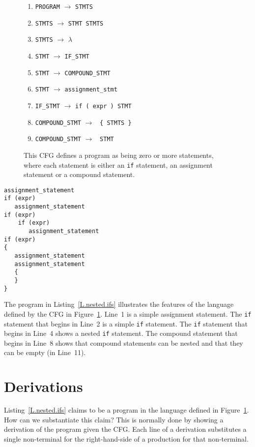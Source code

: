 \documentclass[letterpaper,12pt,openany,reqno]{book}%
\newcommand{\code}[1] {\lstinline[breaklines=yes,breakatwhitespace=yes]{#1}}
\newcommand{\cfgprod}[2] {\texttt{#1} $\rightarrow$ \texttt{#2}}
\begin{document}
\begin{figure}[hbt]
\centering
\begin{enumerate}
\item \cfgprod{PROGRAM}{STMTS}
\item \cfgprod{STMTS}{STMT STMTS}
\item \cfgprod{STMTS}{$\lambda$}
\item \cfgprod{STMT}{IF\_STMT}
\item \cfgprod{STMT}{COMPOUND\_STMT}
\item \cfgprod{STMT}{assignment\_stmt}
\item \cfgprod{IF\_STMT} {if ( expr ) STMT}
\item \cfgprod{COMPOUND\_STMT} { \{ STMTS \} }
\item \cfgprod{COMPOUND\_STMT} { STMT }
\end{enumerate}
\caption[CFG of a simple programming language]{This CFG defines a program as being zero or more statements, where each statement is either an \code{if} statement, an assignment statement or a compound statement.}
\label{F.cfg.2}
\end{figure}

\begin{lstlisting}[caption={Sample program in the language defined by the CFG in Figure~\ref{F.cfg.2}},label=L.nested.ifs]
assignment_statement
if (expr)
   assignment_statement
if (expr)
    if (expr)
       assignment_statement
if (expr)
{
   assignment_statement
   assignment_statement
   {
   }
}
\end{lstlisting}

The program in Listing~\ref{L.nested.ifs} illustrates the features of the language defined by the CFG in Figure~\ref{F.cfg.2}. Line~1 is a simple assignment statement. The \code{if} statement that begins in Line~2 is a simple \code{if} statement. The \code{if} statement that begins in Line~4 shows a nested \code{if} statement. The compound statement that begins in Line~8 shows that compound statements can be nested and that they can be empty (in Line~11).

\section{Derivations}

Listing~\ref{L.nested.ifs} claims to be a program in the language defined in Figure~\ref{F.cfg.2}. How can we substantiate this claim? This is normally done by showing a derivation of the program given the CFG. Each line of a derivation substitutes a single non-terminal for the right-hand-side of a production for that non-terminal. 
\end{document}
